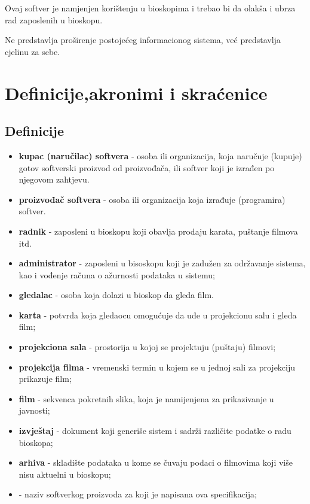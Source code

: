 Ovaj softver je namjenjen korištenju u bioskopima i trebao bi da olakša i ubrza rad zaposlenih u bioskopu.

Ne predstavlja proširenje postojećeg informacionog sistema, već predstavlja cjelinu za sebe.

\section{Definicije,akronimi i skraćenice}
\subsection{Definicije}

\begin{itemize}
\item \textbf{kupac (naručilac) softvera} - osoba ili organizacija, koja naručuje (kupuje) gotov softverski proizvod od proizvođača, ili softver koji je izrađen po njegovom zahtjevu. 
\item \textbf{proizvođač softvera} - osoba ili organizacija koja izrađuje (programira) softver.
\item \textbf{radnik} - zaposleni u bioskopu koji obavlja prodaju karata, puštanje filmova itd.
\item \textbf{administrator} - zaposleni u bisoskopu koji je zadužen za održavanje sistema, kao i vođenje računa o ažurnosti podataka u sistemu;
\item \textbf{gledalac} - osoba koja dolazi u bioskop da gleda film.

\item \textbf{karta} - potvrda koja gledaocu omogućuje da uđe u projekcionu salu i gleda film;

\item \textbf{projekciona sala} - prostorija u kojoj se projektuju (puštaju) filmovi;

\item \textbf{projekcija filma} - vremenski termin u kojem se u jednoj sali za projekciju prikazuje film;

\item \textbf{film} - sekvenca pokretnih slika, koja je namijenjena za prikazivanje u javnosti;

\item \textbf{izvještaj} - dokument koji generiše sistem i sadrži različite podatke o radu bioskopa;

\item \textbf{arhiva} - skladište podataka u kome se čuvaju podaci o filmovima koji više nisu aktuelni u bioskopu;

\item \textbf{\naziv } - naziv softverkog proizvoda za koji je napisana ova specifikacija;

\end{itemize}

